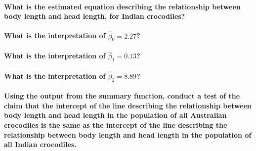 \documentclass[14pt]{extarticle}
\let\oldparagraph\paragraph
\renewcommand{\paragraph}[1]{\oldparagraph{#1}\mbox{}}
\begin{document}
\vspace{3cm}

\paragraph{What is the estimated equation describing the relationship
between body length and head length, for Indian
crocodiles?}\label{what-is-the-estimated-equation-describing-the-relationship-between-body-length-and-head-length-for-indian-crocodiles}

\vspace{3cm}

\paragraph{\texorpdfstring{What is the interpretation of
\(\widehat{\beta}_0 = 2.27\)?}{What is the interpretation of \textbackslash{}widehat\{\textbackslash{}beta\}\_0 = 2.27?}}\label{what-is-the-interpretation-of-widehatbeta_0-2.27}

\vspace{3cm}

\paragraph{\texorpdfstring{What is the interpretation of
\(\widehat{\beta}_1 = 0.13\)?}{What is the interpretation of \textbackslash{}widehat\{\textbackslash{}beta\}\_1 = 0.13?}}\label{what-is-the-interpretation-of-widehatbeta_1-0.13}

\vspace{3cm}

\paragraph{\texorpdfstring{What is the interpretation of
\(\widehat{\beta}_2 = 8.89\)?}{What is the interpretation of \textbackslash{}widehat\{\textbackslash{}beta\}\_2 = 8.89?}}\label{what-is-the-interpretation-of-widehatbeta_2-8.89}

\vspace{3cm}

\paragraph{Using the output from the summary function, conduct a test of
the claim that the intercept of the line describing the relationship
between body length and head length in the population of all Australian
crocodiles is the same as the intercept of the line describing the
relationship between body length and head length in the population of
all Indian
crocodiles.}\label{using-the-output-from-the-summary-function-conduct-a-test-of-the-claim-that-the-intercept-of-the-line-describing-the-relationship-between-body-length-and-head-length-in-the-population-of-all-australian-crocodiles-is-the-same-as-the-intercept-of-the-line-describing-the-relationship-between-body-length-and-head-length-in-the-population-of-all-indian-crocodiles.}
\end{document}

